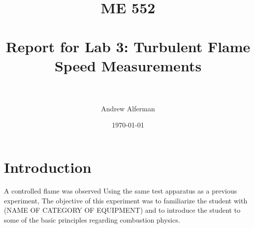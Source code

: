 \documentclass[paper=letter, fontsize=10pt]{scrartcl} %
\title{	
\normalfont \normalsize 
\textsc{ME 552} \\ [25pt] %
\horrule{0.5pt} \\[0.4cm] %
\huge Report for Lab 3: Turbulent Flame Speed Measurements \\ %
\horrule{2pt} \\[0.5cm] %
}
\author{Andrew Alferman} %
\date{\normalsize\today} %
\begin{document}
\iffalse
To include in report:

-Introduction

-Methodology

-Assumptions

-Respond to questions in the handout

-Provide a table with the apparent flame areea

-Conclude by describing what we learned

-Include in appendix documentation about data reduction code and anything else needed to support the discussion

Specifically include:
Table with the apparent flame areas for the different operating conditions.  Provide a detailed explanation of the physical processes causing the observed changes

Process a series of 5 consecutive time-resolved images of the flame for each of the operating conditions and include representative images in the report.  Describe any observed changes for the different conditions and  explain any significance

\fi

\maketitle %

\section{Introduction}
\label{intro}
A controlled flame was observed
Using the same test apparatus as a previous experiment, 
The objective of this experiment was to familiarize the student with (NAME OF CATEGORY OF EQUIPMENT) and to introduce the student to some of the basic principles regarding combustion physics.
\end{document}
